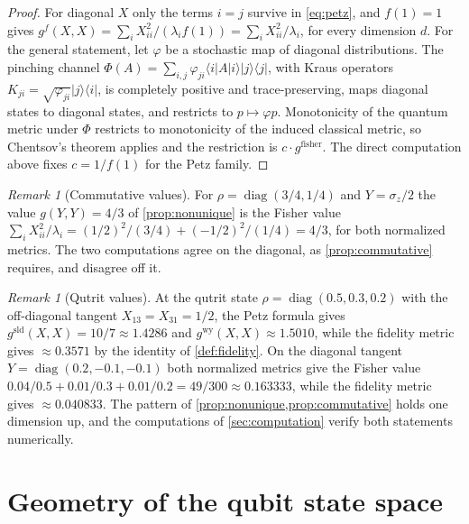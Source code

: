 \documentclass[11pt,letterpaper]{article}
\theoremstyle{definition}
\theoremstyle{remark}
\newtheorem{remark}[theorem]{Remark}
\begin{document}
\begin{proof}
For diagonal $X$ only the terms $i = j$ survive in \eqref{eq:petz}, and $f(1) = 1$ gives $g^f(X,X) = \sum_i X_{ii}^2 / (\lambda_i f(1)) = \sum_i X_{ii}^2 / \lambda_i$, for every dimension $d$. For the general statement, let $\varphi$ be a stochastic map of diagonal distributions. The pinching channel $\Phi(A) = \sum_{i,j} \varphi_{ji} \langle i | A | i \rangle |j\rangle\langle j|$, with Kraus operators $K_{ji} = \sqrt{\varphi_{ji}} |j\rangle\langle i|$, is completely positive and trace-preserving, maps diagonal states to diagonal states, and restricts to $p \mapsto \varphi p$. Monotonicity of the quantum metric under $\Phi$ restricts to monotonicity of the induced classical metric, so Chentsov's theorem applies and the restriction is $c \cdot g^{\mathrm{fisher}}$. The direct computation above fixes $c = 1/f(1)$ for the Petz family.
\end{proof}

\begin{remark}[Commutative values]
\label{rem:commutative}
For $\rho = \operatorname{diag}(3/4, 1/4)$ and $Y = \sigma_z/2$ the value $g(Y, Y) = 4/3$ of \cref{prop:nonunique} is the Fisher value $\sum_i X_{ii}^2 / \lambda_i = (1/2)^2/(3/4) + (-1/2)^2/(1/4) = 4/3$, for both normalized metrics. The two computations agree on the diagonal, as \cref{prop:commutative} requires, and disagree off it.
\end{remark}

\begin{remark}[Qutrit values]
\label{rem:qutrit}
At the qutrit state $\rho = \operatorname{diag}(0.5, 0.3, 0.2)$ with the off-diagonal tangent $X_{13} = X_{31} = 1/2$, the Petz formula gives $g^{\mathrm{sld}}(X, X) = 10/7 \approx 1.4286$ and $g^{\mathrm{wy}}(X, X) \approx 1.5010$, while the fidelity metric gives $\approx 0.3571$ by the identity of \cref{def:fidelity}. On the diagonal tangent $Y = \operatorname{diag}(0.2, -0.1, -0.1)$ both normalized metrics give the Fisher value $0.04/0.5 + 0.01/0.3 + 0.01/0.2 = 49/300 \approx 0.163333$, while the fidelity metric gives $\approx 0.040833$. The pattern of \cref{prop:nonunique,prop:commutative} holds one dimension up, and the computations of \cref{sec:computation} verify both statements numerically.
\end{remark}

\section{Geometry of the qubit state space}
\label{sec:qubit}
\end{document}
